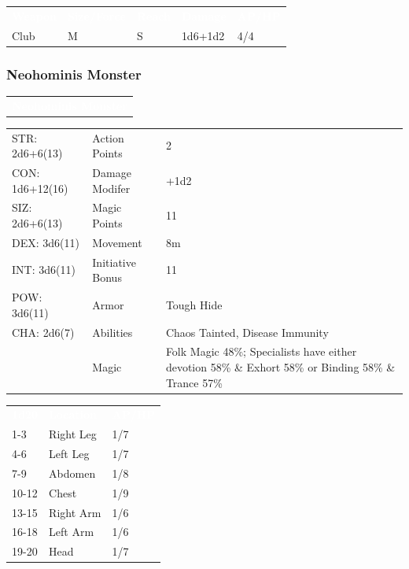 \documentclass[letterpaper,serif]{rpg-module}
\begin{document}
\begin{tabularx}{\linewidth}{XXXXX}
\rowcolor{gray}
\textcolor{white}{\textbf{Weapon}} & \textcolor{white}{\textbf{Size/Force}} & \textcolor{white}{\textbf{Reach}} & \textcolor{white}{\textbf{Damage}} & \textcolor{white}{\textbf{AP/HP}} \\
Club & M & S & 1d6+1d2 & 4/4
\end{tabularx}

\subsubsection{Neohominis Monster}

\lipsum[1]

\vspace{12pt}

\noindent\begin{tabularx}{\linewidth}{X}
\rowcolor{gray}
\textcolor{white}{\textbf{Neohominis Monster}}
\end{tabularx}
\begin{tabularx}{\linewidth}{XXX}
STR: 2d6+6(13) & Action Points & 2 \\
CON: 1d6+12(16) & Damage Modifer & +1d2 \\
SIZ: 2d6+6(13) & Magic Points & 11 \\
DEX: 3d6(11) & Movement & 8m \\
INT: 3d6(11) & Initiative Bonus & 11 \\
POW: 3d6(11) & Armor & Tough Hide \\
CHA: 2d6(7) & Abilities & Chaos Tainted, Disease Immunity \\
    & Magic & Folk Magic 48\%; Specialists have either devotion 58\% \& Exhort 58\% or Binding 58\% \& Trance 57\%
\end{tabularx}

\begin{tabularx}{\linewidth}{XXX}
\rowcolor{gray}
\textcolor{white}{\textbf{1d20}} & \textcolor{white}{\textbf{Location}} & \textcolor{white}{\textbf{AP/HP}} \\
1-3 & Right Leg & 1/7 \\
4-6 & Left Leg & 1/7 \\
7-9 & Abdomen & 1/8 \\
10-12 & Chest & 1/9 \\
13-15 & Right Arm & 1/6 \\
16-18 & Left Arm & 1/6 \\
19-20 & Head & 1/7 
\end{tabularx}
\end{document}
